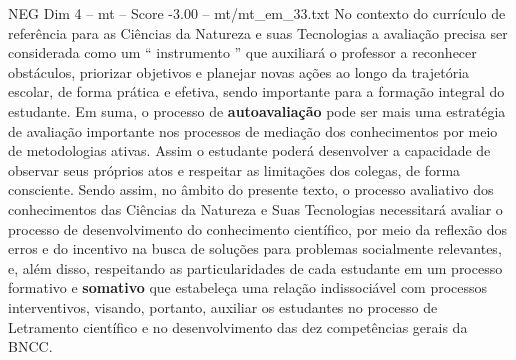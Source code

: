 \begin{textsample}{NEG Dim 4 – mt – Score -3.00 – mt/mt\_em\_33.txt}
No contexto do currículo de referência para as Ciências da Natureza e suas Tecnologias a avaliação precisa ser considerada como um “ instrumento ” que auxiliará o professor a reconhecer obstáculos, priorizar objetivos e planejar novas ações ao longo da trajetória escolar, de forma prática e efetiva, sendo importante para a formação integral do estudante.
Em suma, o processo de \textbf{autoavaliação} pode ser mais uma estratégia de avaliação importante nos processos de mediação dos conhecimentos por meio de metodologias ativas.
Assim o estudante poderá desenvolver a capacidade de observar seus próprios atos e respeitar as limitações dos colegas, de forma consciente.
Sendo assim, no âmbito do presente texto, o processo avaliativo dos conhecimentos das Ciências da Natureza e Suas Tecnologias necessitará avaliar o processo de desenvolvimento do conhecimento científico, por meio da reflexão dos erros e do incentivo na busca de soluções para problemas socialmente relevantes, e, além disso, respeitando as particularidades de cada estudante em um processo formativo e \textbf{somativo} que estabeleça uma relação indissociável com processos interventivos, visando, portanto, auxiliar os estudantes no processo de Letramento científico e no desenvolvimento das dez competências gerais da BNCC.

\end{textsample}
